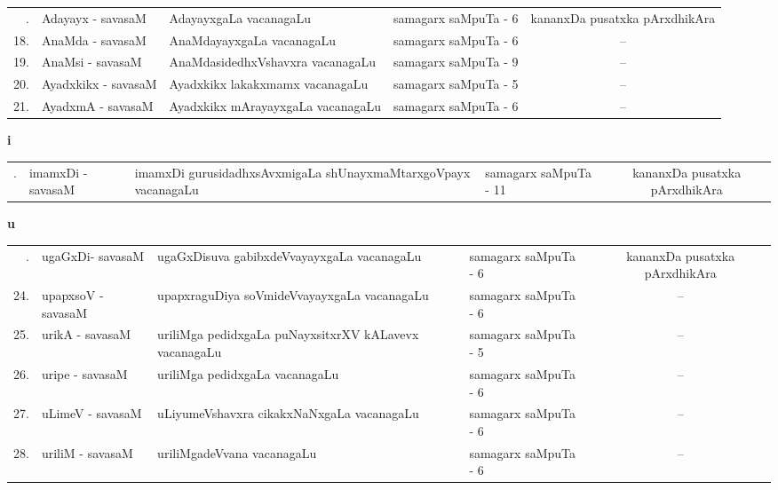{\renewcommand{\arraystretch}{1.35}
\begin{longtable}{rl>{\raggedright}p{5.5cm}lc}
\endfirsthead
\endhead
\endfoot
\endlastfoot
17. & Adayayx - savasaM & AdayayxgaLa vacanagaLu & samagarx saMpuTa - 6 & kananxDa pusatxka pArxdhikAra\\
18. & AnaMda - savasaM & AnaMdayayxgaLa vacanagaLu & samagarx saMpuTa - 6 & --\\
19. & AnaMsi - savasaM & AnaMdasidedhxVshavxra vacanagaLu & samagarx saMpuTa - 9 & --\\
20. & Ayadxkikx - savasaM & Ayadxkikx lakakxmamx vacanagaLu & samagarx saMpuTa - 5 & --\\
21. & AyadxmA - savasaM & Ayadxkikx mArayayxgaLa vacanagaLu & samagarx saMpuTa - 6 & --
\end{longtable}}

\centerline{\bf i}

{\renewcommand{\arraystretch}{1.35}
\begin{longtable}{rl>{\raggedright}p{5.5cm}lc}
\endfirsthead
\endhead
\endfoot
\endlastfoot
22. & imamxDi - savasaM & imamxDi gurusidadhxsAvxmigaLa shUnayxmaMtarxgoVpayx vacanagaLu & samagarx saMpuTa - 11 & kananxDa pusatxka pArxdhikAra\\
\end{longtable}}


\bigskip

\centerline{\bf u}

\medskip

{\renewcommand{\arraystretch}{1.35}
\begin{longtable}{rl>{\raggedright}p{5.5cm}lc}
\endfirsthead
\endhead
\endfoot
\endlastfoot
23. &  ugaGxDi- savasaM & ugaGxDisuva gabibxdeVvayayxgaLa vacanagaLu & samagarx saMpuTa - 6  & kananxDa pusatxka pArxdhikAra\\
24. &  upapxsoV - savasaM & upapxraguDiya soVmideVvayayxgaLa\newline \phantom{AA} vacanagaLu & samagarx saMpuTa - 6 & --\\
25. &  urikA - savasaM & uriliMga pedidxgaLa puNayxsitxrXV kALavevx\newline \phantom{AA} vacanagaLu & samagarx saMpuTa - 5 & --\\
26. &  uripe - savasaM & uriliMga pedidxgaLa vacanagaLu & samagarx saMpuTa - 6 & --\\
27. &  uLimeV - savasaM & uLiyumeVshavxra cikakxNaNxgaLa vacanagaLu & samagarx saMpuTa - 6  & --\\
28. &  uriliM - savasaM & uriliMgadeVvana vacanagaLu & samagarx saMpuTa - 6 & --\\
\end{longtable}}
\bigskip

